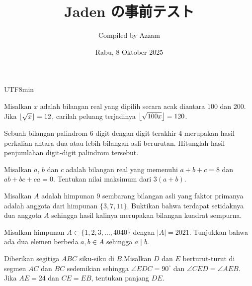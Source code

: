 \documentclass[12pt]{scrartcl}
\title{Jaden の事前テスト}
\begin{document}
\begin{CJK*}{UTF8}{min}
	
	\date{Rabu, 8 Oktober 2025}
	\author{Compiled by Azzam}
	\maketitle

\renewcommand*\contentsname{Daftar Isi}
\tableofcontents

\newpage
	
	\begin{soalbaru}
	Misalkan $x$ adalah bilangan real yang dipilih secara acak diantara 100 dan 200. Jika $\left\lfloor \sqrt{x} \right\rfloor=12$, carilah peluang terjadinya $\left\lfloor \sqrt{100x} \right\rfloor=120$.
	\end{soalbaru}

    \begin{soalbaru}
        Sebuah bilangan palindrom 6 digit dengan digit terakhir 4 merupakan hasil perkalian antara dua atau lebih bilangan asli berurutan. Hitunglah hasil penjumlahan digit-digit palindrom tersebut.
    \end{soalbaru}

    \begin{soalbaru}
        Misalkan $a$, $b$ dan $c$ adalah bilangan real yang memenuhi $a + b + c = 8$ dan $ab + bc + ca = 0$.
Tentukan nilai maksimum dari $3(a + b)$.
    \end{soalbaru}

    \begin{soalbaru}
    Misalkan $A$ adalah himpunan 9 sembarang bilangan asli yang faktor primanya adalah anggota dari himpunan $\{3,7,11\}$. Buktikan bahwa terdapat setidaknya dua anggota $A$ sehingga hasil kalinya merupakan bilangan kuadrat sempurna.
\end{soalbaru}

\begin{soalbaru}
    Misalkan himpunan $A \subset \{1,2,3,\dots,4040\}$ dengan $|A| = 2021$. Tunjukkan bahwa ada dua elemen berbeda $a,b \in A$ sehingga $a \mid b$.
\end{soalbaru}
	
	\begin{soalbaru}
	Diberikan segitiga $ABC$ siku-siku di $B$.Misalkan $D$ dan $E$ berturut-turut di segmen $AC$ dan $BC$ sedemikian sehingga $\angle EDC= 90^\circ$ dan $\angle CED = \angle AEB$. Jika $AE = 24$ dan $CE=EB$, tentukan panjang $DE$.
	\end{soalbaru}
	

\end{CJK*}
\end{document}
